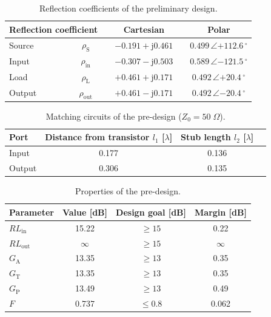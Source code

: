 \documentclass[a4paper, 12pt]{article}
\newlength{\oneLine}
\begin{document}
\begin{table}[!h]
	\begin{center}
		\caption{Reflection coefficients of the preliminary design.}
		\label{t:pre1}
		\renewcommand{\arraystretch}{1.2}
		\begin{tabular}{lcccccc}
			\multicolumn{3}{l}{Reflection coefficient}	& & {Cartesian}	& & Polar 	\\
			\hline
			Source 	& & $\rho_\mathrm{S}$		& &	$-0.191 + \mathrm{j} 0.461$ & &  $0.499 \,\angle {+112.6 {\,}^\circ}$  	\\
			Input 	& & $\rho_\mathrm{in}$		& &	$-0.307 - \mathrm{j} 0.503$	& & $0.589 \,\angle {-121.5 {\,}^\circ}$  	\\
			Load 	& & $\rho_\mathrm{L}$		& &	$+0.461 + \mathrm{j} 0.171$	& & $0.492 \,\angle {+20.4 {\,}^\circ}$  	\\				
			Output 	& & $\rho_\mathrm{out}$		& &	$+0.461 - \mathrm{j} 0.171$	& & $0.492 \,\angle {-20.4 {\,}^\circ}$  				
		\end{tabular}
	\end{center}
	\vspace{-1\oneLine}
\end{table}

\begin{table}[!h]
	\begin{center}
		\caption{Matching circuits of the pre-design ($Z_0 = 50\;\Omega$).}
		\label{t:pre2}
		\renewcommand{\arraystretch}{1.2}
		\begin{tabular}{lccc}
			Port		&	Distance from transistor $l_1$ [$\lambda$]	& Stub length $l_2$ [$\lambda$]	\\
			\hline
			Input		&	0.177										& 0.136				\\
			Output		&	0.306										& 0.135			
		\end{tabular}
	\end{center}
	\vspace{-\oneLine}
\end{table}

\begin{table}[!h]
	\begin{center}
		\caption{Properties of the pre-design.}
		\label{t:pre3}
		\renewcommand{\arraystretch}{1.2}
		\begin{tabular}{lccc}
			Parameter						&	Value [dB]	& Design goal [dB] 	& Margin [dB]	\\
			\hline
			$\mathit{RL}_\mathrm{in}$		&	15.22		& $\geq 15$ 		& 0.22			\\
			$\mathit{RL}_\mathrm{out}$		&	$\infty$	& $\geq 15$  		& $\infty$		\\
			$G_\mathrm{A}$					&	13.35		& $\geq 13$  		& 0.35			\\				
			$G_\mathrm{T}$					&	13.35		& $\geq 13$  		& 0.35			\\
			$G_\mathrm{P}$					&	13.49		& $\geq 13$  		& 0.49			\\
			$F$								&	0.737		& $\leq 0.8$ 		& 0.062				
		\end{tabular}
	\end{center}
	\vspace{-1\oneLine}
\end{table}
\end{document}
